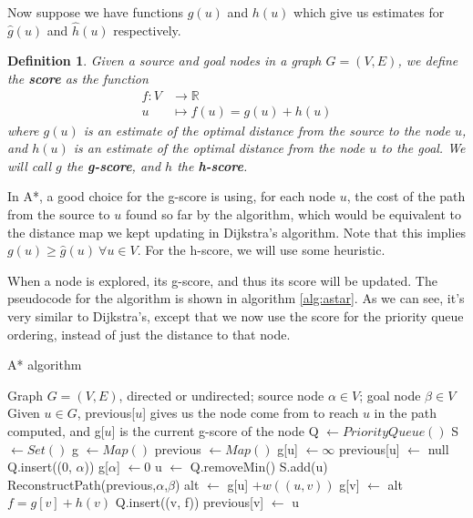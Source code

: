 \documentclass[12pt]{report}
\newtheorem{definition}[theorem]{Definition}
\begin{document}
Now suppose we have functions $g(u)$ and $h(u)$ which give us estimates for $\hat{g}(u)$ and $\hat{h}(u)$ respectively.

\begin{definition}
Given a source and goal nodes in a graph $G = (V, E)$, we define the \textbf{score} as the function
\begin{align*}
	f \colon V &\to \mathbb{R}\\
	u &\mapsto f(u) = g(u) + h(u)
\end{align*}
where $g(u)$ is an estimate of the optimal distance from the source to the node $u$, and $h(u)$ is an estimate of the optimal distance from the node $u$ to the goal.
We will call $g$ the \textbf{g-score}, and $h$ the \textbf{h-score}.
\end{definition}

In A*, a good choice for the g-score is using, for each node $u$, the cost of the path from the source to $u$ found so far by the algorithm, which would be equivalent to the distance map we kept updating in Dijkstra's algorithm. Note that this implies $g(u) \geq \hat{g}(u) \ \forall u \in V$. For the h-score, we will use some heuristic.

When a node is explored, its g-score, and thus its score will be updated. The pseudocode for the algorithm is shown in algorithm \ref{alg:astar}. As we can see, it's very similar to Dijkstra's, except that we now use the score for the priority queue ordering, instead of just the distance to that node.

\begin{algorithm}
\caption{A* algorithm}
\label{alg:astar}
\begin{algorithmic}[1]
\Require Graph $G = (V, E)$, directed or undirected; source node $\alpha \in V$; goal node $\beta \in V$
\Ensure Given $u \in G$, previous[$u$] gives us the node come from to reach $u$ in the path computed, and g[$u$] is the current g-score of the node
\State Q $\gets PriorityQueue()$
\State S $\gets Set()$
\State g $\gets Map()$
\State previous $\gets Map()$
	\State g[u] $\gets \infty$
	\State previous[u] $\gets$ null
\EndFor
\State Q.insert((0, $\alpha$))
\State g[$\alpha$] $\gets 0$
	\State u $\gets$ Q.removeMin()
	\State S.add(u)
	 
		\State \Return ReconstructPath(previous,$\alpha$,$\beta$)
	\EndIf
			\Continue {}
		\EndIf
		\State alt $\gets$ g[u] $+ w((u, v))$
			\State g[v] $\gets$ alt 
			\State $f = g[v] + h(v)$
			\State Q.insert((v, f))
			\State previous[v] $\gets$ u
		\EndIf
	\EndFor
\EndWhile
\EndProcedure
\end{algorithmic}
\end{algorithm}
\end{document}
